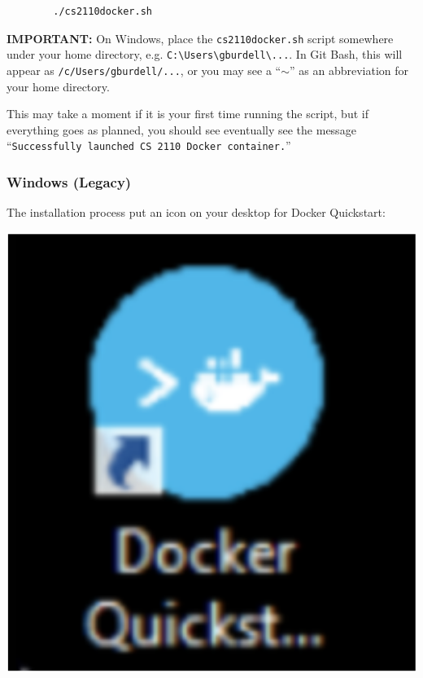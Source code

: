 \begin{center}
    \begin{verbatim}
        ./cs2110docker.sh
    \end{verbatim}
\end{center}

\textbf{IMPORTANT:} On Windows, place the \texttt{cs2110docker.sh} script somewhere under your home directory, e.g. \texttt{C:\textbackslash{}Users\textbackslash{}gburdell\textbackslash{}...}. In Git Bash, this will appear as \texttt{/c/Users/gburdell/...}, or you may see a ``\texttt{$\sim$}'' as an abbreviation for your home directory.

This may take a moment if it is your first time running the script, but if everything goes as planned, you should see eventually see the message ``\texttt{Successfully launched CS 2110 Docker container.}''

\subsubsection{Windows (Legacy)}

The installation process put an icon on your desktop for Docker Quickstart:

\begin{center}
    \includegraphics[scale=0.1]{dockerquickstart.png}
\end{center}

